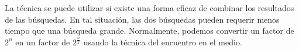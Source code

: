La técnica se puede utilizar si existe una forma eficaz de combinar los resultados de las búsquedas. En tal situación, las dos búsquedas pueden requerir menos tiempo que una búsqueda grande. Normalmente, podemos convertir un factor de $2^n$ en un factor de $2^{\frac{n}{2}}$ usando la técnica del encuentro en el medio.

